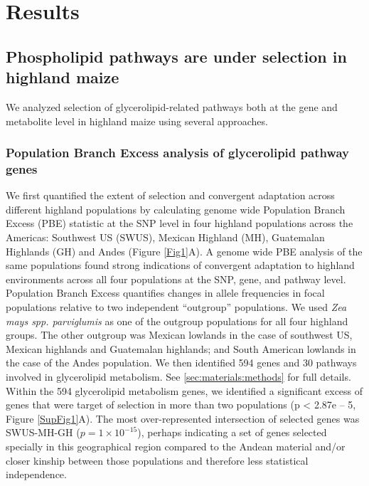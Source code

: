 \documentclass[9pt,twocolumn,twoside]{BioRxiv}
\begin{document}
\section{Results}
\label{sec:results}

\subsection{Phospholipid pathways are under selection in  highland maize} 
We analyzed selection of glycerolipid-related pathways both at the gene and metabolite level in highland maize using several approaches.
\subsubsection{Population Branch Excess analysis of glycerolipid pathway genes} 
We first quantified the extent of selection and convergent adaptation across different highland populations by calculating genome wide Population Branch Excess (PBE) statistic \cite{Pool2017-oa} at the SNP level in four highland populations across the Americas: Southwest US (SWUS), Mexican Highland (MH), Guatemalan Highlands (GH) and Andes (Figure \ref{Fig1}A). 
A genome wide PBE analysis of the same populations \cite{Wang2020-mp} found strong indications of convergent adaptation to highland environments across all four populations at the SNP, gene, and pathway level.
Population Branch Excess quantifies changes in allele frequencies in focal populations relative to two independent “outgroup” populations. 
We used \textit{Zea mays spp. parviglumis} as one of the outgroup populations for all four highland groups.  
The other outgroup was  Mexican lowlands  in the case of southwest US, Mexican highlands and Guatemalan highlands; and South American lowlands in the case of the Andes population. 
We then identified 594 genes and 30 pathways involved in glycerolipid metabolism. 
See \ref{sec:materials:methods} for full details. 
Within the 594 glycerolipid metabolism genes, we identified a significant excess of genes that were target of selection in more than two populations (p < 2.87e – 5, Figure \ref{SupFig1}A).  
The most over-represented intersection of selected genes was SWUS-MH-GH ($p = 1  \times 10 ^{-15} $), perhaps indicating a set of genes selected specially in this geographical region compared to the Andean material and/or closer kinship between those populations and therefore less statistical independence.   
\end{document}

